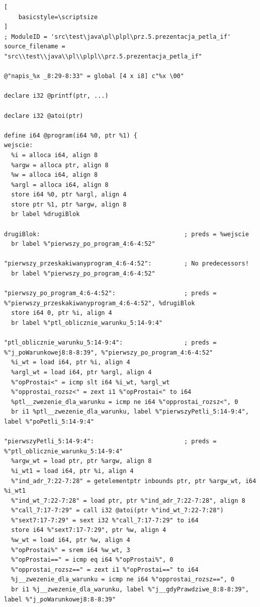 \begin{lstlisting}[
    basicstyle=\scriptsize
]
; ModuleID = 'src\test\java\pl\plpl\prz.5.prezentacja_petla_if'
source_filename = "src\\test\\java\\pl\\plpl\\prz.5.prezentacja_petla_if"

@"napis_%x _8:29-8:33" = global [4 x i8] c"%x \00"

declare i32 @printf(ptr, ...)

declare i32 @atoi(ptr)

define i64 @program(i64 %0, ptr %1) {
wejscie:
  %i = alloca i64, align 8
  %argw = alloca ptr, align 8
  %w = alloca i64, align 8
  %argl = alloca i64, align 8
  store i64 %0, ptr %argl, align 4
  store ptr %1, ptr %argw, align 8
  br label %drugiBlok

drugiBlok:                                        ; preds = %wejscie
  br label %"pierwszy_po_program_4:6-4:52"

"pierwszy_przeskakiwanyprogram_4:6-4:52":         ; No predecessors!
  br label %"pierwszy_po_program_4:6-4:52"

"pierwszy_po_program_4:6-4:52":                   ; preds = %"pierwszy_przeskakiwanyprogram_4:6-4:52", %drugiBlok
  store i64 0, ptr %i, align 4
  br label %"ptl_oblicznie_warunku_5:14-9:4"

"ptl_oblicznie_warunku_5:14-9:4":                 ; preds = %"j_poWarunkowej8:8-8:39", %"pierwszy_po_program_4:6-4:52"
  %i_wt = load i64, ptr %i, align 4
  %argl_wt = load i64, ptr %argl, align 4
  %"opProstai<" = icmp slt i64 %i_wt, %argl_wt
  %"opprostai_rozsz<" = zext i1 %"opProstai<" to i64
  %ptl__zwezenie_dla_warunku = icmp ne i64 %"opprostai_rozsz<", 0
  br i1 %ptl__zwezenie_dla_warunku, label %"pierwszyPetli_5:14-9:4", label %"poPetli_5:14-9:4"

"pierwszyPetli_5:14-9:4":                         ; preds = %"ptl_oblicznie_warunku_5:14-9:4"
  %argw_wt = load ptr, ptr %argw, align 8
  %i_wt1 = load i64, ptr %i, align 4
  %"ind_adr_7:22-7:28" = getelementptr inbounds ptr, ptr %argw_wt, i64 %i_wt1
  %"ind_wt_7:22-7:28" = load ptr, ptr %"ind_adr_7:22-7:28", align 8
  %"call_7:17-7:29" = call i32 @atoi(ptr %"ind_wt_7:22-7:28")
  %"sext7:17-7:29" = sext i32 %"call_7:17-7:29" to i64
  store i64 %"sext7:17-7:29", ptr %w, align 4
  %w_wt = load i64, ptr %w, align 4
  %"opProstai%" = srem i64 %w_wt, 3
  %"opProstai==" = icmp eq i64 %"opProstai%", 0
  %"opprostai_rozsz==" = zext i1 %"opProstai==" to i64
  %j__zwezenie_dla_warunku = icmp ne i64 %"opprostai_rozsz==", 0
  br i1 %j__zwezenie_dla_warunku, label %"j__gdyPrawdziwe_8:8-8:39", label %"j_poWarunkowej8:8-8:39"


\end{lstlisting}
